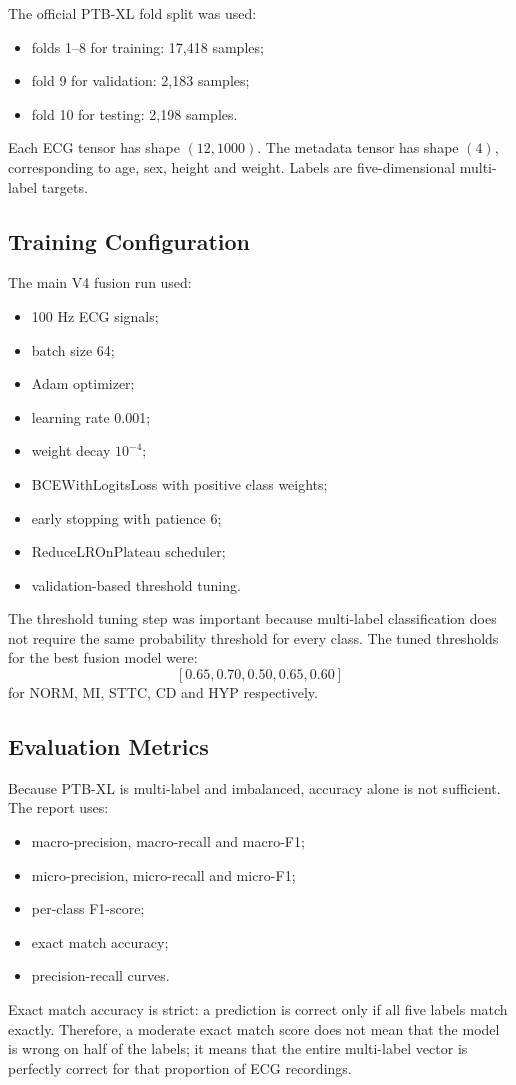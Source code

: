 \documentclass[11pt,a4paper]{article}
\begin{document}
The official PTB-XL fold split was used:
\begin{itemize}[noitemsep]
    \item folds 1--8 for training: 17,418 samples;
    \item fold 9 for validation: 2,183 samples;
    \item fold 10 for testing: 2,198 samples.
\end{itemize}
Each ECG tensor has shape \((12,1000)\). The metadata tensor has shape \((4)\), corresponding to age, sex, height and weight. Labels are five-dimensional multi-label targets.

\subsection{Training Configuration}

The main V4 fusion run used:
\begin{itemize}[noitemsep]
    \item 100 Hz ECG signals;
    \item batch size 64;
    \item Adam optimizer;
    \item learning rate 0.001;
    \item weight decay \(10^{-4}\);
    \item BCEWithLogitsLoss with positive class weights;
    \item early stopping with patience 6;
    \item ReduceLROnPlateau scheduler;
    \item validation-based threshold tuning.
\end{itemize}

The threshold tuning step was important because multi-label classification does not require the same probability threshold for every class. The tuned thresholds for the best fusion model were:
\[
    [0.65, 0.70, 0.50, 0.65, 0.60]
\]
for NORM, MI, STTC, CD and HYP respectively.

\subsection{Evaluation Metrics}

Because PTB-XL is multi-label and imbalanced, accuracy alone is not sufficient. The report uses:
\begin{itemize}[noitemsep]
    \item macro-precision, macro-recall and macro-F1;
    \item micro-precision, micro-recall and micro-F1;
    \item per-class F1-score;
    \item exact match accuracy;
    \item precision-recall curves.
\end{itemize}
Exact match accuracy is strict: a prediction is correct only if all five labels match exactly. Therefore, a moderate exact match score does not mean that the model is wrong on half of the labels; it means that the entire multi-label vector is perfectly correct for that proportion of ECG recordings.
\end{document}
